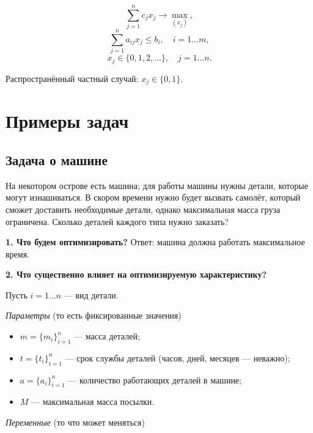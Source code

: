 

\[\sum_{j=1}^{n} c_j x_j \to \max_{(x_j)},\]
\[\sum_{j=1}^{n}a_{ij} x_j \le b_i, \quad i = 1\dots m,\]
\[x_j \in \{0, 1, 2, \dots\}, \quad j = 1\dots n.\]

Распространённый частный случай: $x_j \in \{0, 1\}$.

\section{Примеры задач}

\subsection{Задача о машине}

\problem\label{pr:car_on_island}

На некотором острове есть машина; для работы машины нужны детали, которые могут изнашиваться. В скором времени нужно будет вызвать самолёт, который сможет доставить необходимые детали, однако максимальная масса груза ограничена. Сколько деталей каждого типа нужно заказать?

\mathmodel

\textbf{1. Что будем оптимизировать?} Ответ: машина должна работать максимальное время.

\bigskip

\textbf{2. Что существенно влияет на оптимизируемую характеристику?}

Пусть $i = 1 \dots n$ --- вид детали.

\bigskip

\textit{Параметры} (то есть фиксированные значения)

\begin{itemize}[nosep]
	\item $m = \{m_i\}_{i=1}^n$ --- масса деталей;
	
	\item $t = \{t_i\}_{i=1}^n$ --- срок службы деталей (часов, дней, месяцев --- неважно);

	\item $a = \{a_i\}_{i=1}^n$ --- количество работающих деталей в машине;
	
	\item $M$ --- максимальная масса посылки.
\end{itemize}

\bigskip

\textit{Переменные} (то что может меняться)

